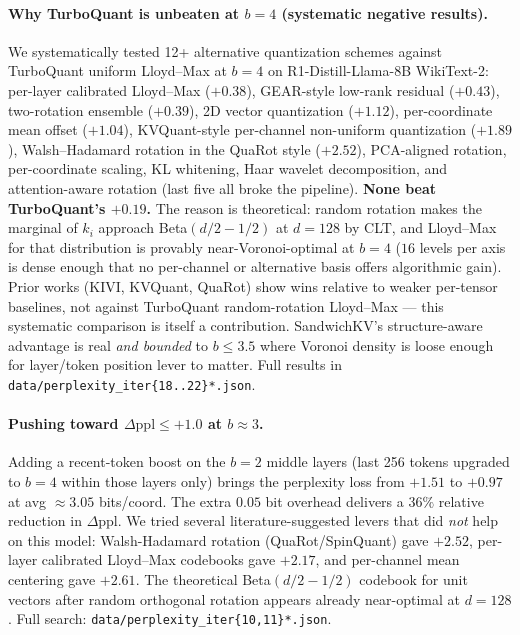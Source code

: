 \documentclass[11pt]{article}
\theoremstyle{definition}
\begin{document}
\paragraph{Why TurboQuant is unbeaten at $b{=}4$ (systematic negative results).}
We systematically tested 12+ alternative quantization schemes against TurboQuant
uniform Lloyd--Max at $b{=}4$ on R1-Distill-Llama-8B WikiText-2: per-layer
calibrated Lloyd--Max ($+0.38$), GEAR-style low-rank residual ($+0.43$),
two-rotation ensemble ($+0.39$), 2D vector quantization ($+1.12$),
per-coordinate mean offset ($+1.04$), KVQuant-style per-channel non-uniform
quantization ($+1.89$), Walsh--Hadamard rotation in the QuaRot style ($+2.52$),
PCA-aligned rotation, per-coordinate scaling, KL whitening, Haar wavelet
decomposition, and attention-aware rotation (last five all broke the
pipeline). \textbf{None beat TurboQuant's $+0.19$.} The reason is theoretical:
random rotation makes the marginal of $k_i$ approach Beta$(d/2-1/2)$ at
$d{=}128$ by CLT, and Lloyd--Max for that distribution is provably
near-Voronoi-optimal at $b{=}4$ ($16$ levels per axis is dense enough that
no per-channel or alternative basis offers algorithmic gain). Prior works
(KIVI, KVQuant, QuaRot) show wins relative to weaker per-tensor baselines, not
against TurboQuant random-rotation Lloyd--Max --- this systematic comparison
is itself a contribution. SandwichKV's structure-aware advantage is real \emph{and
bounded} to $b\le 3.5$ where Voronoi density is loose enough for layer/token
position lever to matter. Full results in \texttt{data/perplexity\_iter\{18..22\}*.json}.

\paragraph{Pushing toward $\Delta\text{ppl} \le +1.0$ at $b{\approx}3$.}
Adding a recent-token boost on the $b{=}2$ middle layers (last 256 tokens
upgraded to $b{=}4$ within those layers only) brings the perplexity loss
from $+1.51$ to $\boldsymbol{+0.97}$ at avg $\approx 3.05$ bits/coord. The
extra $0.05$ bit overhead delivers a $36\%$ relative reduction in
$\Delta\text{ppl}$. We tried several literature-suggested levers that did
\emph{not} help on this model: Walsh-Hadamard rotation
(QuaRot/SpinQuant) gave $+2.52$, per-layer calibrated Lloyd--Max codebooks
gave $+2.17$, and per-channel mean centering gave $+2.61$. The
theoretical Beta$(d/2-1/2)$ codebook for unit vectors after random
orthogonal rotation appears already near-optimal at $d{=}128$. Full
search: \texttt{data/perplexity\_iter\{10,11\}*.json}.
\end{document}
